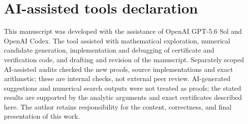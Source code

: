 \documentclass[11pt]{article}
\begin{document}
\section*{AI-assisted tools declaration}

This manuscript was developed with the assistance of OpenAI GPT-5.6 Sol and OpenAI Codex.
The tool assisted with mathematical exploration, numerical candidate
generation, implementation and debugging of certificate and verification
code, and drafting and revision of the manuscript. Separately scoped AI-assisted
audits checked the new proofs, source implementations and exact arithmetic;
these are internal checks, not external peer review. AI-generated suggestions
and numerical search outputs were not treated as proofs; the stated results
are supported by the analytic arguments and exact certificates described
here.  The author retains responsibility for the content, correctness, and
final presentation of this work.


\begingroup
\small
\sloppy
\raggedright

\endgroup
\end{document}
